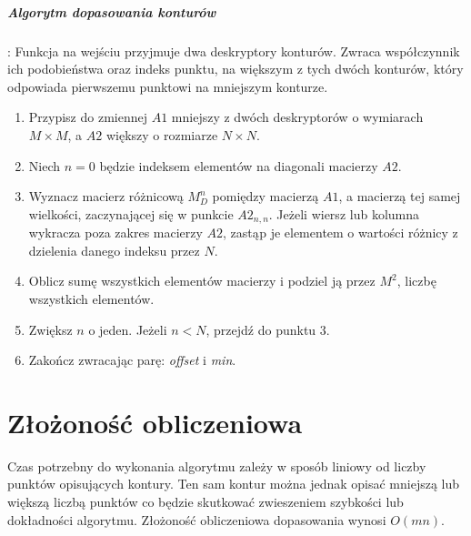 \subparagraph{Algorytm dopasowania konturów}: Funkcja na wejściu przyjmuje dwa
deskryptory konturów. Zwraca współczynnik ich podobieństwa oraz indeks punktu,
na większym z tych dwóch konturów, który odpowiada pierwszemu punktowi na
mniejszym konturze.

\begin{enumerate} \item Przypisz do zmiennej $A1$ mniejszy z dwóch deskryptorów
    o wymiarach $M \times M$, a $A2$ większy o rozmiarze $N \times N$. \item
    Niech $n = 0$ będzie indeksem elementów na diagonali macierzy $A2$. \item
    Wyznacz macierz różnicową $M_{D}^n$ pomiędzy macierzą $A1$, a macierzą tej
    samej wielkości, zaczynającej się w punkcie $A2_{n,n}$. Jeżeli wiersz lub
    kolumna wykracza poza zakres macierzy $A2$, zastąp je elementem o wartości
    różnicy z dzielenia danego indeksu przez $N$. \item Oblicz sumę wszystkich
    elementów macierzy i podziel ją przez $M^2$, liczbę wszystkich elementów.
  \item Zwiększ $n$ o jeden. Jeżeli $n < N$, przejdź do punktu 3. \item Zakończ
    zwracając parę: \textit{offset} i \textit{min}.  \end{enumerate}

\section{Złożoność obliczeniowa}

Czas potrzebny do wykonania algorytmu zależy w sposób liniowy od liczby punktów
opisujących kontury. Ten sam kontur można jednak opisać mniejszą lub większą
liczbą punktów co będzie skutkować zwieszeniem szybkości lub dokładności
algorytmu. Złożoność obliczeniowa dopasowania wynosi $O(mn)$.
